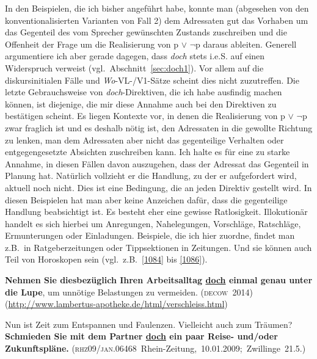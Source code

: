 In den Beispielen, die ich bisher angeführt habe, konnte man (abgesehen von den konventionalisierten Varianten von Fall 2) dem Adressaten gut das Vorhaben um das Gegenteil des vom Sprecher gewünschten Zustands zuschreiben und die Offenheit der Frage um die Rea\-lisierung von p $\vee$ $\neg$p daraus ableiten. Generell argumentiere ich aber gerade dagegen, dass \textit{doch} stets i.e.S. auf einen Widerspruch verweist (vgl.\ Abschnitt~\ref{sec:doch1}). Vor allem auf die diskursinitialen Fälle und \textit{Wo}-VL-/V1-Sätze scheint dies nicht zuzutreffen. Die letzte Gebrauchsweise von \textit{doch}-Direktiven, die ich habe ausfindig machen können, ist diejenige, die mir diese Annahme auch bei den Direktiven zu bestätigen scheint. Es liegen Kontexte vor, in denen die Realisierung von  p $\vee$ $\neg$p zwar fraglich ist und es deshalb nötig ist, den Adressaten in die gewollte Richtung zu lenken, man dem Adressaten aber nicht das gegenteilige Verhalten oder entgegengesetzte Absichten zuschreiben kann. Ich halte es für eine zu starke Annahme, in diesen Fällen davon auszugehen, dass der Adressat das Gegenteil in Planung hat. Natürlich vollzieht er die Handlung, zu der er aufgefordert wird, aktuell noch nicht. Dies ist eine Bedingung, die an jeden Direktiv gestellt wird. In diesen Beispielen hat man aber keine Anzeichen dafür, dass die gegenteilige Handlung beabsichtigt ist. Es besteht eher eine gewisse Ratlosigkeit. Illokutionär handelt es sich hierbei um Anregungen, Nahelegungen, Vorschläge, Ratschläge, Ermunterungen oder Einladungen. Beispiele, die ich hier zuordne, findet man z.B.\ in Ratgeberzeitungen oder Tippsektionen in Zeitungen. Und sie können auch Teil von Horoskopen sein (vgl.\ z.B.\ \ref{1084} bis \ref{1086}).

\begin{exe}
	\ex\label{1084} 

	\textbf{Nehmen Sie diesbezüglich Ihren Arbeitsalltag \ul{doch} einmal genau unter die Lupe}, um unnötige Belastungen zu vermeiden.	
	\hfill\hbox{\scshape(decow 2014)}  
	\newline
	{\scriptsize(\url{http://www.lambertus-apotheke.de/html/verschleiss.html}) 				     }
\end{exe}

\begin{exe}
	\ex\label{1085} 

	Nun ist Zeit zum Entspannen und Faulenzen. Vielleicht auch zum Träumen? \textbf{Schmieden Sie mit dem Partner \ul{doch} ein paar Reise- und/oder 	Zukunftspläne.} 	
	\newline
	\hbox{}\hfill\hbox{(\textsc{rhz09/jan.06468} Rhein-Zeitung, 10.01.2009; Zwillinge 21.5.)} 				     
\end{exe}
				        
